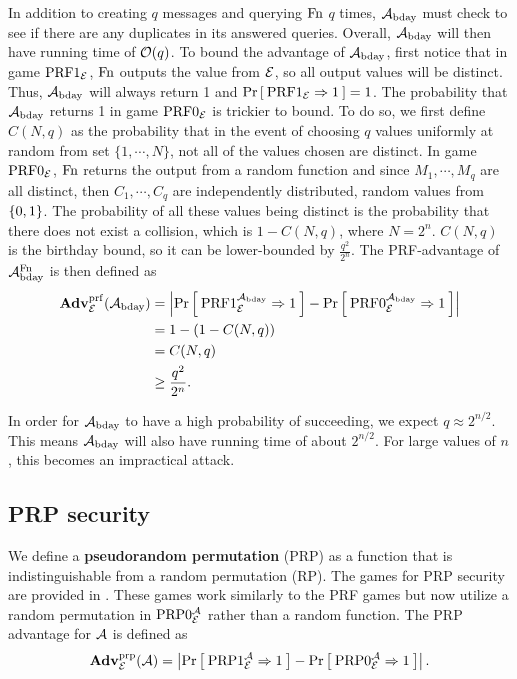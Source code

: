 In addition to creating $q$ messages and querying $\textnormal{Fn}$ $q$ times, ${\mathcal A}_{\text{bday}}$ must check to see if there are any duplicates in its answered queries. Overall, ${\mathcal A}_{\text{bday}}$ will then have running time of ${\cal O}(q)$.
To bound the advantage of ${\mathcal A}_{\text{bday}}$, first notice that in game $\textnormal{PRF}1_{{\cal E}}$, $\textnormal{Fn}$ outputs the value from ${\cal E}$, so all output values will be distinct. Thus, ${\mathcal A}_{\text{bday}}$ will always return 1 and $\Pr\left[\: \textnormal{PRF}1_{\cal E}\Rightarrow 1 \:\right]=1$. The probability that ${\mathcal A}_{\text{bday}}$ returns 1 in game $\textnormal{PRF}0_{{\cal E}}$ is trickier to bound. To do so, we first define $C(N,q)$ as the probability that in the event of choosing $q$ values uniformly at random from set $\{1,\cdots,N\}$, not all of the values chosen are distinct. In game $\textnormal{PRF}0_{{\cal E}}$, $\textnormal{Fn}$ returns the output from a random function and since $M_1, \cdots, M_q$ are all distinct, then $C_1, \cdots, C_q$ are independently distributed, random values from $\{0,1\}$. The probability of all these values being distinct is the probability that there does not exist a collision, which is $1-C(N,q)$, where $N=2^n$. $C(N,q)$ is the birthday bound, so it can be lower-bounded by $\frac{q^2}{2^n}$. 
The PRF-advantage of ${\mathcal A}^{\textnormal{Fn}}_{\text{bday}}$ is then defined as 
\begin{align*}
\mathbf{Adv}^{\mathrm{prf}}_{{\cal E}}({\mathcal A}_\text{bday}) &= \left| \Pr\left[\: \textnormal{PRF}1_{\cal E}^{{\mathcal A}_\text{bday}}\Rightarrow 1 \:\right] 
- \Pr\left[\: \textnormal{PRF}0_{\cal E}^{{\mathcal A}_\text{bday}}\Rightarrow1 \:\right] \right| \\
&= 1 - (1 - C(N,q)) \\ 
&= C(N,q) \\ 
&\geq \frac{q^2}{2^n}.
\end{align*}

In order for ${\mathcal A}_{\text{bday}}$ to have a high probability of succeeding, we expect $q \approx 2^{n/2}$. This means ${\mathcal A}_{\text{bday}}$ will also have running time of about $2^{n/2}$. For large values of $n$, this becomes an impractical attack. 


\subsection{PRP security} 
We define a \textbf{pseudorandom permutation} (PRP) as a function that is indistinguishable from a random permutation (RP). The games for PRP security are provided in . These games work similarly to the PRF games but now utilize a random permutation in $\textnormal{PRP}0_{\cal E}^{\mathcal A}$ rather than a random function. The PRP advantage for ${\mathcal A}$ is defined as 
\begin{equation*}
\mathbf{Adv}^{\mathrm{prp}}_{{\cal E}}({\mathcal A}) = \left| \Pr\left[\: \textnormal{PRP}1_{\cal E}^{\mathcal A}\Rightarrow 1 \:\right] 
- \Pr\left[\: \textnormal{PRP}0_{\cal E}^{\mathcal A}\Rightarrow1 \:\right] \right|.
\end{equation*}

